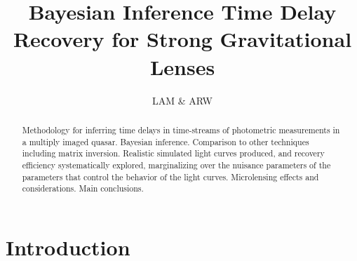 \documentclass{emulateapj}
\begin{document}
\title{Bayesian Inference Time Delay Recovery for Strong Gravitational Lenses}

\author{LAM \& ARW}

\begin{abstract}
Methodology for inferring time delays in time-streams of photometric
measurements in a multiply imaged quasar.  Bayesian
inference. Comparison to other techniques including matrix inversion.
Realistic simulated light curves produced, and recovery efficiency
systematically explored, marginalizing over the nuisance parameters of
the parameters that control the behavior of the light curves.
Microlensing effects and considerations.  Main conclusions.
\end{abstract}
 

\section{Introduction}



\end{document}
